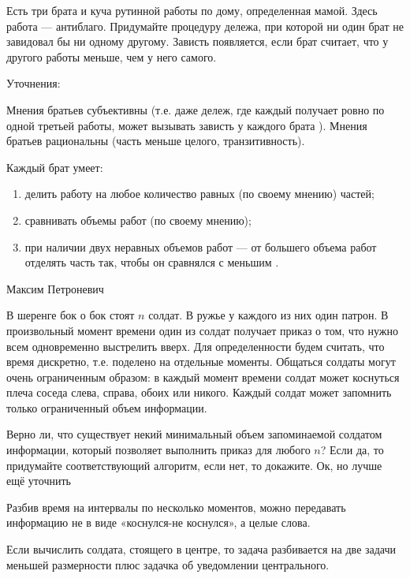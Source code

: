 \begin{problem}

Есть три брата и куча рутинной работы по дому, определенная мамой. Здесь работа — антиблаго. Придумайте процедуру дележа, при которой ни один брат не завидовал бы ни одному другому. Зависть появляется, если брат считает, что у другого работы меньше, чем у него самого. \par
Уточнения: \par
Мнения братьев субъективны (т.е. даже дележ, где каждый получает ровно по одной третьей работы, может вызывать зависть у каждого брата ). Мнения братьев рациональны (часть меньше целого, транзитивность). \par
Каждый брат умеет:
\begin{enumerate}
\item  делить работу на любое количество равных (по своему мнению) частей;
\item сравнивать объемы работ (по своему мнению);
\item  при наличии двух неравных объемов работ — от большего объема работ отделять часть так, чтобы он сравнялся с меньшим \cite{peterson:epefcd}.
\end{enumerate}


\begin{sol}

\end{sol}
\end{problem}



\begin{problem}
\begin{source}
Максим Петроневич
\end{source}
В шеренге бок о бок стоят  $n$  солдат. В ружье у каждого из них один патрон. В произвольный момент времени один из солдат получает приказ о том, что нужно всем одновременно выстрелить вверх. Для определенности будем считать, что время дискретно, т.е. поделено на отдельные моменты. Общаться солдаты могут очень ограниченным образом: в каждый момент времени солдат может коснуться плеча соседа слева, справа, обоих или никого. Каждый солдат может запомнить только ограниченный объем информации.\par
Верно ли, что существует некий минимальный объем запоминаемой солдатом информации, который позволяет выполнить приказ для любого  $n$? Если да, то придумайте соответствующий алгоритм, если нет, то докажите.
{\red Ок, но лучше ещё уточнить}


\begin{sol}

Разбив время на интервалы по несколько моментов, можно передавать информацию не в виде «коснулся-не коснулся», а целые слова.\par
Если вычислить солдата, стоящего в центре, то задача разбивается на две задачи меньшей размерности плюс задачка об уведомлении центрального.
\end{sol}
\end{problem}







